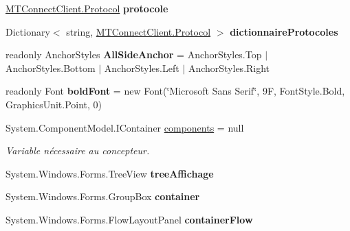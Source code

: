 \begin{DoxyCompactItemize}
\mbox{\hyperlink{class_m_t_connect_agent_1_1_b_l_l_1_1_m_t_connect_client_a2f390f74a0ad3ee5147e9438ceed6474}{M\+T\+Connect\+Client.\+Protocol}} {\bfseries protocole}
\item 
Dictionary$<$ string, \mbox{\hyperlink{class_m_t_connect_agent_1_1_b_l_l_1_1_m_t_connect_client_a2f390f74a0ad3ee5147e9438ceed6474}{M\+T\+Connect\+Client.\+Protocol}} $>$ {\bfseries dictionnaire\+Protocoles}
\item 
\mbox{\label{class_m_t_connect_agent_1_1_user_control_display_tab_aa600efb65adb7313ed6e5ec98c84863c}} 
readonly Anchor\+Styles {\bfseries All\+Side\+Anchor} = Anchor\+Styles.\+Top $\vert$ Anchor\+Styles.\+Bottom $\vert$ Anchor\+Styles.\+Left $\vert$ Anchor\+Styles.\+Right
\item 
\mbox{\label{class_m_t_connect_agent_1_1_user_control_display_tab_a2de53bacd7b44a121af957bda6d0faa4}} 
readonly Font {\bfseries bold\+Font} = new Font(\char`\"{}Microsoft Sans Serif\char`\"{}, 9\+F, Font\+Style.\+Bold, Graphics\+Unit.\+Point, 0)
\item 
System.\+Component\+Model.\+I\+Container \mbox{\hyperlink{class_m_t_connect_agent_1_1_user_control_display_tab_a69ab804e102c9f7530a0441d2dd65da6}{components}} = null
\begin{DoxyCompactList}\small\item\em Variable nécessaire au concepteur. \end{DoxyCompactList}\item 
\mbox{\label{class_m_t_connect_agent_1_1_user_control_display_tab_ac4f4ff399ae001cb2d8774b58a4e5532}} 
System.\+Windows.\+Forms.\+Tree\+View {\bfseries tree\+Affichage}
\item 
\mbox{\label{class_m_t_connect_agent_1_1_user_control_display_tab_a0f26e5be51a11045133d1bdd3b8ebaee}} 
System.\+Windows.\+Forms.\+Group\+Box {\bfseries container}
\item 
\mbox{\label{class_m_t_connect_agent_1_1_user_control_display_tab_a11dd621a8bf6a2d3b0be91f20fc0c9f0}} 
System.\+Windows.\+Forms.\+Flow\+Layout\+Panel {\bfseries container\+Flow}

\end{DoxyCompactItemize}
